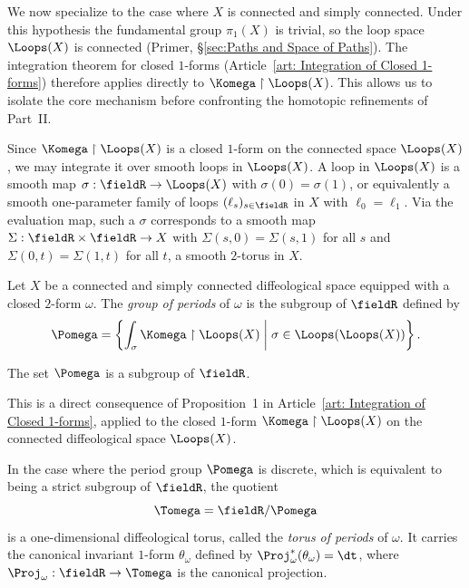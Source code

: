 \begin{article}
  \label{art:group-of-periods}
  We now specialize to the case where $X$ is connected and simply connected.
  Under this hypothesis the fundamental group $\pi_1(X)$ is trivial,
  so the loop space $\Loops(X)$ is connected
  (Primer, \S\ref{sec:Paths and Space of Paths}).
  The integration theorem for closed $1$-forms
  (Article~\ref{art: Integration of Closed 1-forms})
  therefore applies directly to
  $\Komega \restriction \Loops(X)$.
  This allows us to isolate the core mechanism
  before confronting the homotopic refinements of Part~II.
  
  Since $\Komega \restriction \Loops(X)$ is a closed $1$-form
  on the connected space $\Loops(X)$,
  we may integrate it over smooth loops in $\Loops(X)$.
  A loop in $\Loops(X)$ is a smooth map
  $\sigma: \fieldR \to \Loops(X)$ with $\sigma(0) = \sigma(1)$,
  or equivalently a smooth one-parameter family of loops
  $(\ell_s)_{s \in \fieldR}$ in $X$ with $\ell_0 = \ell_1$.
  Via the evaluation map,
  such a $\sigma$ corresponds to a smooth map
  $\Sigma: \fieldR \times \fieldR \to X$
  with $\Sigma(s,0) = \Sigma(s,1)$ for all $s$
  and $\Sigma(0,t) = \Sigma(1,t)$ for all $t$,
  \ie a smooth $2$-torus in $X$.
  
  \begin{definition}
    Let $X$ be a connected and simply connected diffeological space
    equipped with a closed $2$-form $\omega$.
    The \emph{group of periods} of $\omega$ is the subgroup of $\fieldR$ defined by
    \[
      \Pomega = \left\{
      \int_\sigma \Komega \restriction \Loops(X)
      \;\middle|\;
      \sigma \in \Loops(\Loops(X))
      \right\}.
      \]%
  \end{definition}
  
  \begin{proposition}
    The set $\Pomega$ is a subgroup of $\fieldR$.
  \end{proposition}
  
  This is a direct consequence of Proposition~1 in Article~\ref{art: Integration of Closed 1-forms},
  applied to the closed $1$-form $\Komega \restriction \Loops(X)$ on the connected diffeological space $\Loops(X)$.
  
  \begin{definition}
    In the case where the period group $\Pomega$ is discrete,
    which is equivalent to being a strict subgroup of $\fieldR$,
    the quotient
    \[
      \Tomega = \fieldR/\Pomega
      \]%
    is a one-dimensional diffeological torus,
    called the \emph{torus of periods} of $\omega$.
    It carries the canonical invariant $1$-form $\theta_\omega$
    defined by $\Proj_\omega^*(\theta_\omega) = \dt$,
    where $\Proj_\omega: \fieldR \to \Tomega$ is the canonical projection.
  \end{definition}
  

\end{article}
